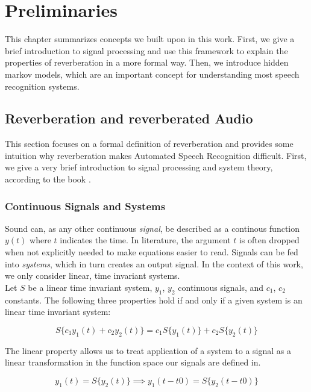 \chapter{Preliminaries}
\label{ch:preleminaries}

This chapter summarizes concepts we built upon in this work. First, we give a brief introduction to signal processing and use this framework to explain the properties of reverberation in a more formal way. Then, we introduce hidden markov models, which are an important concept for understanding most speech recognition systems. 

\section{Reverberation and reverberated Audio}
\label{sec:reverberation}

This section focuses on a formal definition of reverberation and provides some intuition why reverberation makes Automated Speech Recognition difficult. First, we give a very brief introduction to signal processing and system theory, according to the book \cite{leon2015signale}.

\subsection{Continuous Signals and Systems}

Sound can, as any other continuous \textit{signal}, be described as a continous function $y(t)$ where $t$ indicates the time. In literature, the argument $t$ is often dropped  when not explicitly needed to make equations easier to read.  
Signals can be fed into \textit{systems}, which in turn creates an output signal. In the context of this work, we only consider linear, time invariant systems. 
\\
Let $S$ be a linear time invariant system, $y_1$, $y_2$ continuous signals, and $c_1$, $c_2$ constants. The following three properties hold if and only if a given system is an linear time invariant system: 

\[S\{c_1 y_1(t) + c_2 y_2(t)\} = c_1 S\{y_1(t)\} + c_2 S\{y_2(t)\} \tag{linearity}\]

The linear property allows us to treat application of a system to a signal as a linear transformation in the function space our signals are defined in. 

\[y_1(t) = S\{y_2(t)\} \implies y_1(t - t0) = S\{y_2(t - t0)\} \tag{time invariance}\]

